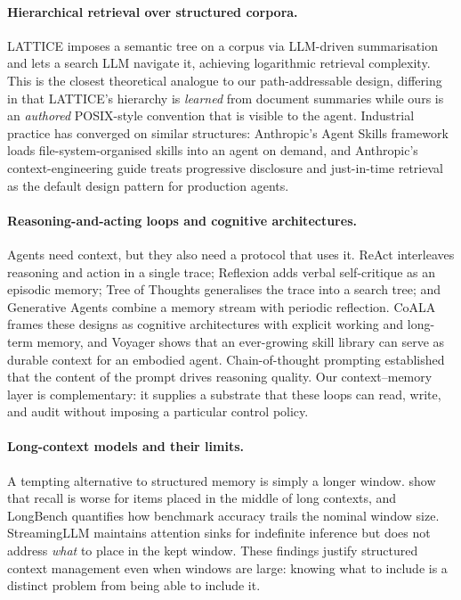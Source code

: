 \paragraph{Hierarchical retrieval over structured corpora.}
LATTICE \citep{gupta2025lattice} imposes a semantic tree on a corpus
via LLM-driven summarisation and lets a search LLM navigate it,
achieving logarithmic retrieval complexity. This is the closest
theoretical analogue to our path-addressable design, differing in
that LATTICE's hierarchy is \emph{learned} from document summaries
while ours is an \emph{authored} POSIX-style convention that is
visible to the agent. Industrial practice has converged on similar
structures: Anthropic's Agent Skills framework \citep{anthropic2025skills}
loads file-system-organised skills into an agent on demand, and
Anthropic's context-engineering guide \citep{anthropic2025contexteng}
treats progressive disclosure and just-in-time retrieval as the
default design pattern for production agents.

\paragraph{Reasoning-and-acting loops and cognitive architectures.}
Agents need context, but they also need a protocol that uses it.
ReAct \citep{yao2023react} interleaves reasoning and action in a
single trace; Reflexion \citep{shinn2023reflexion} adds verbal
self-critique as an episodic memory; Tree of Thoughts
\citep{yao2023tot} generalises the trace into a search tree; and
Generative Agents \citep{park2023generative} combine a memory stream
with periodic reflection. CoALA \citep{sumers2024coala} frames these
designs as cognitive architectures with explicit working and
long-term memory, and Voyager \citep{wang2023voyager} shows that an
ever-growing skill library can serve as durable context for an
embodied agent. Chain-of-thought prompting \citep{wei2022cot}
established that the content of the prompt drives reasoning quality.
Our context--memory layer is complementary: it supplies a substrate
that these loops can read, write, and audit without imposing a
particular control policy.

\paragraph{Long-context models and their limits.}
A tempting alternative to structured memory is simply a longer
window. \citet{liu2024lostmiddle} show that recall is worse for items
placed in the middle of long contexts, and LongBench
\citep{bai2024longbench} quantifies how benchmark accuracy trails the
nominal window size. StreamingLLM \citep{xiao2024streamingllm}
maintains attention sinks for indefinite inference but does not
address \emph{what} to place in the kept window. These findings
justify structured context management even when windows are large:
knowing what to include is a distinct problem from being able to
include it.


